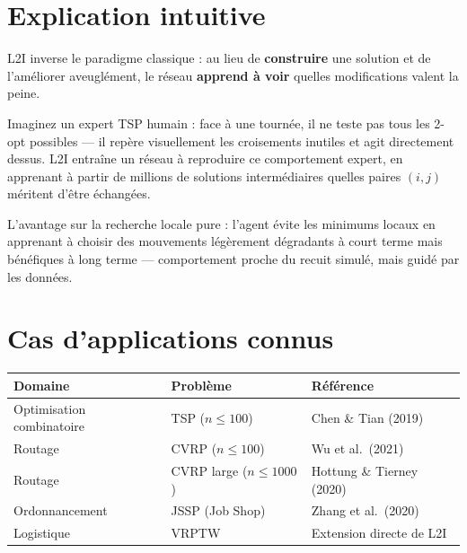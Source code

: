 \documentclass[11pt,a4paper]{article}
\begin{document}
\section{Explication intuitive}

\begin{tcolorbox}[intuition]
L2I inverse le paradigme classique : au lieu de \textbf{construire} une
solution et de l'améliorer aveuglément, le réseau \textbf{apprend à voir}
quelles modifications valent la peine.

Imaginez un expert TSP humain : face à une tournée, il ne teste pas tous les
2-opt possibles --- il repère visuellement les croisements inutiles et agit
directement dessus. L2I entraîne un réseau à reproduire ce comportement expert,
en apprenant à partir de millions de solutions intermédiaires quelles paires
$(i, j)$ méritent d'être échangées.

L'avantage sur la recherche locale pure : l'agent évite les minimums locaux
en apprenant à choisir des mouvements légèrement dégradants à court terme
mais bénéfiques à long terme --- comportement proche du recuit simulé, mais
guidé par les données.
\end{tcolorbox}

\section{Cas d'applications connus}

\begin{center}
\begin{tabularx}{\textwidth}{llX}
  \toprule
  Domaine & Problème & Référence \\
  \midrule
  Optimisation combinatoire & TSP ($n \leq 100$) & Chen \& Tian (2019) \\
  Routage & CVRP ($n \leq 100$) & Wu et al.\ (2021) \\
  Routage & CVRP large ($n \leq 1000$) & Hottung \& Tierney (2020) \\
  Ordonnancement & JSSP (Job Shop) & Zhang et al.\ (2020) \\
  Logistique & VRPTW & Extension directe de L2I \\
  \bottomrule
\end{tabularx}
\end{center}

\end{document}
